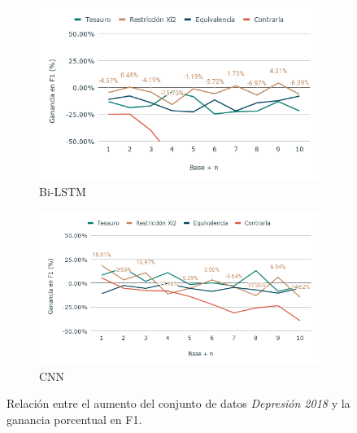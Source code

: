 \begin{figure}[hbt!]
    \begin{subfigure}[b]{0.5\textwidth}
        \includegraphics[width=\textwidth]{sections/figures/bi_LSTM2018.png}
        \caption{Bi-LSTM}
    \end{subfigure}
    \hfill
    \begin{subfigure}[b]{0.5\textwidth}
        \includegraphics[width=\textwidth]{sections/figures/CNN2018.png}
        \caption{CNN}
    \end{subfigure}
    
  

   
    \caption{Relación entre el aumento del conjunto de datos \textit{Depresión 2018} y la ganancia porcentual en F1.}
    \label{fig:aumento_n_depresion}
\end{figure}
